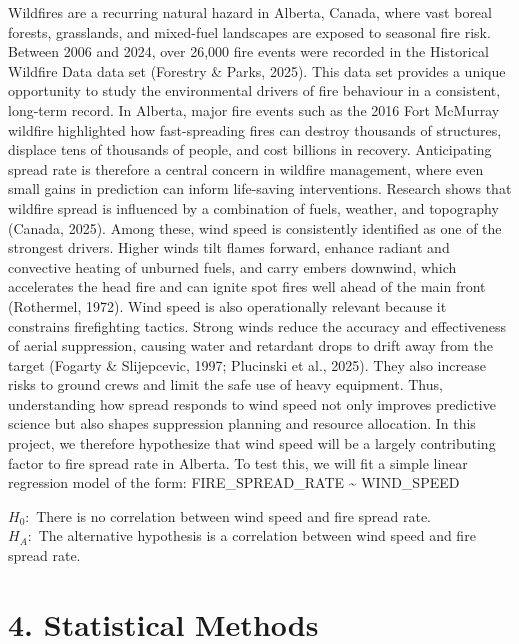 \documentclass[
]{article}
\begin{document}
Wildfires are a recurring natural hazard in Alberta, Canada, where vast
boreal forests, grasslands, and mixed-fuel landscapes are exposed to
seasonal fire risk. Between 2006 and 2024, over 26,000 fire events were
recorded in the Historical Wildfire Data data set (Forestry \& Parks,
2025). This data set provides a unique opportunity to study the
environmental drivers of fire behaviour in a consistent, long-term
record. In Alberta, major fire events such as the 2016 Fort McMurray
wildfire highlighted how fast-spreading fires can destroy thousands of
structures, displace tens of thousands of people, and cost billions in
recovery. Anticipating spread rate is therefore a central concern in
wildfire management, where even small gains in prediction can inform
life-saving interventions. Research shows that wildfire spread is
influenced by a combination of fuels, weather, and topography (Canada,
2025). Among these, wind speed is consistently identified as one of the
strongest drivers. Higher winds tilt flames forward, enhance radiant and
convective heating of unburned fuels, and carry embers downwind, which
accelerates the head fire and can ignite spot fires well ahead of the
main front (Rothermel, 1972). Wind speed is also operationally relevant
because it constrains firefighting tactics. Strong winds reduce the
accuracy and effectiveness of aerial suppression, causing water and
retardant drops to drift away from the target (Fogarty \& Slijepcevic,
1997; Plucinski et al., 2025). They also increase risks to ground crews
and limit the safe use of heavy equipment. Thus, understanding how
spread responds to wind speed not only improves predictive science but
also shapes suppression planning and resource allocation. In this
project, we therefore hypothesize that wind speed will be a largely
contributing factor to fire spread rate in Alberta. To test this, we
will fit a simple linear regression model of the form:
FIRE\_SPREAD\_RATE \textasciitilde{} WIND\_SPEED

\begin{center}
$H_{0}:$ There is no correlation between wind speed and fire spread rate. \\
$H_{A}:$ The alternative hypothesis is a correlation between wind speed and fire spread rate.
\end{center}

\section{4. Statistical Methods}\label{statistical-methods}
\end{document}
